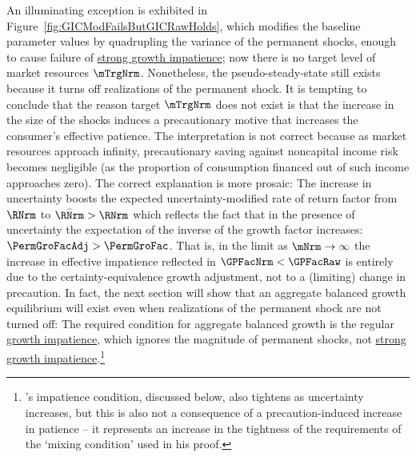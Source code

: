 \documentclass[BufferStockTheory]{subfiles}
\begin{document}
An illuminating exception is exhibited in Figure~\ref{fig:GICModFailsButGICRawHolds}, which modifies the baseline parameter values by quadrupling the variance of the permanent shocks, enough to cause failure of \hyperlink{GICMod}{strong growth impatience}; now there is no target level of market resources $\mTrgNrm$.  Nonetheless, the pseudo-steady-state still exists because it turns off realizations of the permanent shock.  It is tempting to conclude that the reason target $\mTrgNrm$ does not exist is that the increase in the size of the shocks induces a precautionary motive that increases the consumer's effective patience. The interpretation is not correct because as market resources approach infinity, precautionary saving against noncapital income risk becomes negligible (as the proportion of consumption financed out of such income approaches zero).  The correct explanation is more prosaic: The increase in uncertainty boosts the expected uncertainty-modified rate of return factor from $\RNrm$ to $\bar{\RNrm}>\RNrm$ which reflects the fact that in the presence of uncertainty the expectation of the inverse of the growth factor increases: $\PermGroFacAdj > \PermGroFac$.  That is, in the limit as $\mNrm \rightarrow \infty$ the increase in effective impatience reflected in $\GPFacNrm < \GPFacRaw$ is entirely due to the certainty-equivalence growth adjustment, not to a (limiting) change in precaution.  In fact, the next section will show that an aggregate balanced growth equilibrium will exist even when realizations of the permanent shock are not turned off: The required condition for aggregate balanced growth is the regular \hyperlink{GICRaw}{growth impatience}, which ignores the magnitude of permanent shocks, not \hyperlink{GICMod}{strong growth impatience}.\footnote{\cite{szeidlInvariant}'s impatience condition, discussed below, also tightens as uncertainty increases, but this is also not a consequence of a precaution-induced increase in patience -- it represents an increase in the tightness of the requirements of the `mixing condition' used in his proof.}

\begin{comment}
again, removed FHWC above since GIC holds. double check. 
\end{comment}
\end{document}
